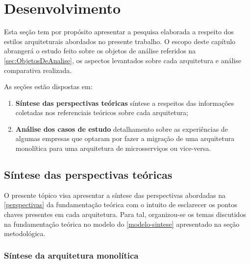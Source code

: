 \chapter{Desenvolvimento}

Esta seção tem por propósito apresentar a pesquisa elaborada a respeito dos estilos arquiteturais
abordados no presente trabalho. O escopo deste capítulo abrangerá o estudo feito sobre os objetos de
análise referidos na \autoref{sec:ObjetosDeAnalise}, os aspectos levantados sobre cada
arquitetura e análise comparativa realizada.

As seções estão dispostas em:

  \begin{enumerate}
    \item \textbf{Síntese das perspectivas teóricas} síntese a respeitos das informações
        coletadas nos referenciais teóricos sobre cada arquitetura;
    \item \textbf{Análise dos casos de estudo} detalhamento sobre as experiências de algumas empresas
    que optaram por fazer a migração de uma arquitetura monolítica para uma arquitetura de
    microsserviços ou vice-versa.
  \end{enumerate}

\section{Síntese das perspectivas teóricas}
\label{sinteses}

O presente tópico visa apresentar a síntese das perspectivas abordadas na \autoref{perspectivas} da
fundamentação teórica com o intuito de esclarecer os pontos chaves presentes em cada arquitetura.
Para tal, organizou-se os temas discutidos na fundamentação teórica no modelo do \autoref{modelo-sintese} 
apresentado na seção metodológica.

\subsection{Síntese da arquitetura monolítica}
\label{monoSintese}

